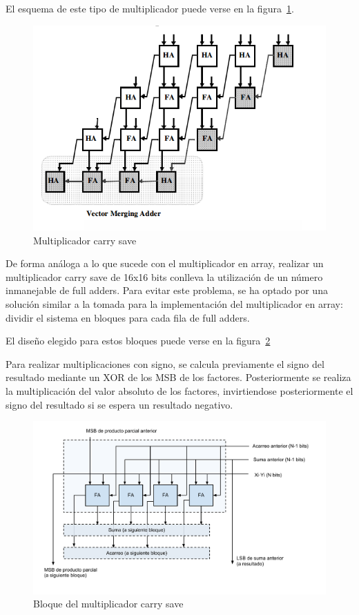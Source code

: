 \documentclass[a4paper,12pt]{article}
\begin{document}
El esquema de este tipo de multiplicador puede verse en la figura~\ref{fig:carry_save_multiplier}.

\begin{figure}[hbt]
\includegraphics[width=\textwidth]{img/carry_save_mult.png} 
\caption{Multiplicador carry save} \label{fig:carry_save_multiplier}
\end{figure}

De forma análoga a lo que sucede con el multiplicador en array, realizar un multiplicador carry save de 16x16 bits conlleva la utilización de un número inmanejable de full adders. Para evitar este problema, se ha optado por una solución similar a la tomada para la implementación del multiplicador en array: dividir el sistema en bloques para cada fila de full adders.

El diseño elegido para estos bloques puede verse en la figura~\ref{fig:carry_save_block}

Para realizar multiplicaciones con signo, se calcula previamente el signo del resultado mediante un XOR de los MSB de los factores. Posteriormente se realiza la multiplicación del valor absoluto de los factores, invirtiendose posteriormente el signo del resultado si se espera un resultado negativo.

\begin{figure}[hbt]
\includegraphics[width=\textwidth]{img/carry_save_block.pdf} 
\caption{Bloque del multiplicador carry save} \label{fig:carry_save_block}
\end{figure}
\end{document}
